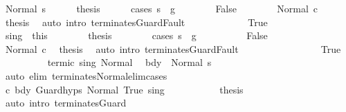 \begin{isabellebody}
\ {\isacharparenleft}Normal\ s{\isacharprime}{\isacharparenright}\isanewline
\ \ \ \ \isamarkupfalse%
\ {\isacharquery}thesis\isanewline
\ \ \ \ \isamarkupfalse%
\ {\isacharparenleft}cases\ {\isachardoublequoteopen}s{\isacharprime}\ {\isasymin}\ g{}{\isachardoublequoteclose}{\isacharparenright}\isanewline
\ \ \ \ \ \ \isamarkupfalse%
\ False\isanewline
\ \ \ \ \ \ \isamarkupfalse%
\ Normal\ c\ \isamarkupfalse%
\ {\isacharquery}thesis\ \isamarkupfalse%
\ {\isacharparenleft}auto\ intro{\isacharcolon}\ terminates{\isachardot}GuardFault{\isacharparenright}\isanewline
\ \ \ \ \isamarkupfalse%
\isanewline
\ \ \ \ \ \ \isamarkupfalse%
\ True\isanewline
\ \ \ \ \ \ \isamarkupfalse%
\ s{\isacharunderscore}in{\isacharunderscore}g{}\ {\isacharequal}\ this\isanewline
\ \ \ \ \ \ \isamarkupfalse%
\ {\isacharquery}thesis\isanewline
\ \ \ \ \ \ \isamarkupfalse%
\ {\isacharparenleft}cases\ {\isachardoublequoteopen}s{\isacharprime}\ {\isasymin}\ g{}{\isachardoublequoteclose}{\isacharparenright}\isanewline
\ \ \ \ \ \ \ \ \isamarkupfalse%
\ False\isanewline
\ \ \ \ \ \ \ \ \isamarkupfalse%
\ Normal\ c\ \isamarkupfalse%
\ {\isacharquery}thesis\ \isamarkupfalse%
\ {\isacharparenleft}auto\ intro{\isacharcolon}\ terminates{\isachardot}GuardFault{\isacharparenright}\isanewline
\ \ \ \ \ \ \isamarkupfalse%
\isanewline
\ \ \ \ \ \ \ \ \isamarkupfalse%
\ True\isanewline
\ \ \ \ \ \ \ \ \isamarkupfalse%
\ termi{\isacharunderscore}c{}\ s{\isacharunderscore}in{\isacharunderscore}g{}\ Normal\ \isamarkupfalse%
\ {\isachardoublequoteopen}{\isasymGamma}{\isasymturnstile}bdy{}\ {\isasymdown}\ Normal\ s{\isacharprime}{\isachardoublequoteclose}\isanewline
\ \ \ \ \ \ \ \ \ \ \isamarkupfalse%
\ {\isacharparenleft}auto\ elim{\isacharcolon}\ terminates{\isacharunderscore}Normal{\isacharunderscore}elim{\isacharunderscore}cases{\isacharparenright}\isanewline
\ \ \ \ \ \ \ \ \isamarkupfalse%
\ c\ bdy\ Guard{\isachardot}hyps\ Normal\ True\ s{\isacharunderscore}in{\isacharunderscore}g{}\ \isanewline
\ \ \ \ \ \ \ \ \isamarkupfalse%
\ {\isacharquery}thesis\ \isamarkupfalse%
\ {\isacharparenleft}auto\ intro{\isacharcolon}\ terminates{\isachardot}Guard{\isacharparenright}\isanewline

\end{isabellebody}
